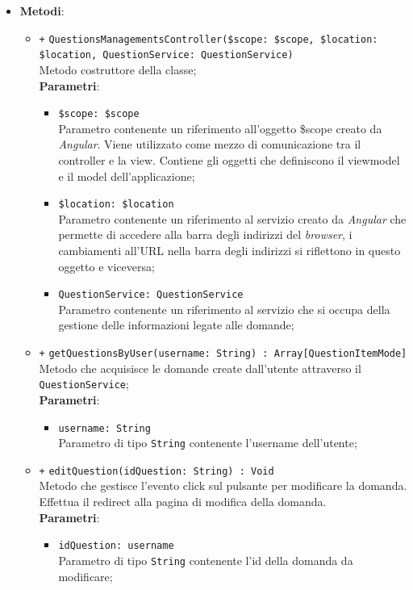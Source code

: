 \begin{itemize}
	\item \textbf{Metodi}:
	\begin{itemize}
		\item \texttt{+} \texttt{QuestionsManagementsController(\$scope: \$scope, \$location: \$location, QuestionService: QuestionService)} \\ 
		Metodo costruttore della classe; \\
		\textbf{Parametri}:
		\begin{itemize}
			\item \texttt{\$scope: \$scope} \\
			Parametro contenente un riferimento all’oggetto \$scope creato da \textit{Angular}. Viene utilizzato come mezzo di comunicazione tra il controller e la view. Contiene gli oggetti che definiscono il viewmodel e il model dell’applicazione;
			\item \texttt{\$location: \$location} \\
			Parametro contenente un riferimento al servizio creato da \textit{Angular} che permette di accedere alla barra degli indirizzi del \textit{browser}, i cambiamenti all’URL nella barra degli indirizzi si riflettono in questo oggetto e viceversa;
			\item \texttt{QuestionService: QuestionService} \\
			Parametro contenente un riferimento al servizio che si occupa della gestione delle informazioni legate alle domande;
		\end{itemize}
		\item \texttt{+} \texttt{getQuestionsByUser(username: String) : Array[QuestionItemMode]} \\ 
		Metodo che acquisisce le domande create dall'utente attraverso il \texttt{QuestionService};\\
		\textbf{Parametri}:
		\begin{itemize}
			\item \texttt{username: String} \\
			Parametro di tipo \texttt{String} contenente l'username dell'utente;
		\end{itemize}
		\item \texttt{+} \texttt{editQuestion(idQuestion: String) : Void} \\ 
		Metodo che gestisce l’evento click sul pulsante per modificare la domanda. Effettua il redirect alla pagina di modifica della domanda. \\
		\textbf{Parametri}:
		\begin{itemize}
			\item \texttt{idQuestion: username} \\
			Parametro di tipo \texttt{String} contenente l'id della domanda da modificare;
		\end{itemize}
	\end{itemize}
\end{itemize}


